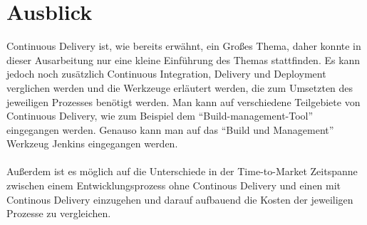 \section{Ausblick}
\label{sec:ausblick}
Continuous Delivery ist, wie bereits erwähnt, ein Großes Thema, daher konnte in dieser Ausarbeitung nur eine kleine Einführung des Themas stattfinden. Es kann jedoch noch zusätzlich Continuous Integration, Delivery und Deployment verglichen werden und die Werkzeuge erläutert werden, die zum Umsetzten des jeweiligen Prozesses benötigt werden. Man kann auf verschiedene Teilgebiete von Continuous Delivery, wie zum Beispiel dem "`Build-management-Tool"' eingegangen werden. Genauso kann man auf das "`Build und Management"' Werkzeug Jenkins eingegangen werden.
\\\\
Außerdem ist es möglich auf die Unterschiede in der Time-to-Market Zeitspanne zwischen einem Entwicklungsprozess ohne Continous Delivery und einen mit Continous Delivery einzugehen und darauf aufbauend die Kosten der jeweiligen Prozesse zu vergleichen.
